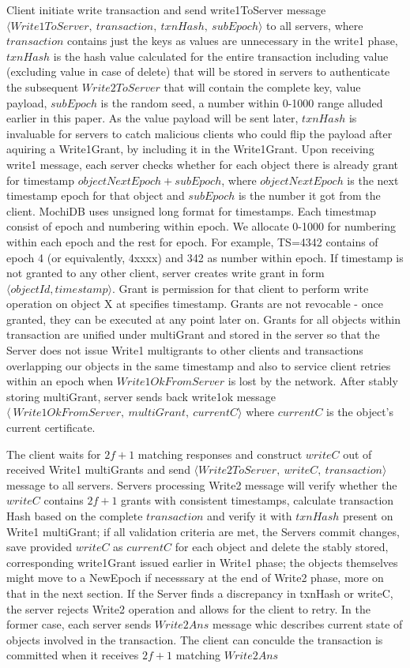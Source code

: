 \documentclass[letterpaper,twocolumn,10pt]{article}
\begin{document}
Client initiate write transaction and send write1ToServer message $\langle Write1ToServer,\ transaction,\ txnHash,\ subEpoch \rangle$ to all servers, where $transaction$ contains just the keys as values are unnecessary in the write1 phase, $txnHash$ is the hash value calculated for the entire transaction including value (excluding value in case of delete) that will be stored in servers to authenticate the subsequent $Write2ToServer$ that will contain the complete key, value payload, $subEpoch$ is the random seed, a number within 0-1000 range alluded earlier in this paper. As the value payload will be sent later, $txnHash$ is invaluable for servers to catch malicious clients who could flip the payload after aquiring a Write1Grant, by including it in the Write1Grant. Upon receiving write1 message, each server checks whether for each object there is already grant for timestamp $objectNextEpoch + subEpoch$, where $objectNextEpoch$ is the next timestamp epoch for that object and $subEpoch$ is the number it got from the client. MochiDB uses unsigned long format for timestamps. Each timestmap consist of epoch and numbering within epoch. We allocate 0-1000 for numbering within each epoch and the rest for epoch. For example, TS=4342 contains of epoch 4 (or equivalently, 4xxxx) and 342 as number within epoch. If timestamp is not granted to any other client, server creates write grant in form $\langle objectId, timestamp \rangle$. Grant is permission for that client to perform write operation on object X at specifies timestamp. Grants are not revocable - once granted, they can be executed at any point later on. Grants for all objects within transaction are unified under multiGrant and stored in the server so that the Server does not issue Write1 multigrants to other clients and transactions overlapping our objects in the same timestamp and also to service client retries within an epoch when $Write1OkFromServer$ is lost by the network. After stably storing multiGrant, server sends back write1ok message $\langle\ Write1OkFromServer,\ multiGrant,\ currentC \rangle$ where $currentC$ is the object's current certificate.

The client waits for $2f+1$ matching responses and construct $writeC$ out of received Write1 multiGrants and send $\langle Write2ToServer,\ writeC,\ transaction \rangle$ message to all servers. Servers processing Write2 message will verify whether the $writeC$ contains $2f+1$ grants with consistent timestamps, calculate transaction Hash based on the complete $transaction$ and verify it with $txnHash$ present on Write1 multiGrant; if all validation criteria are met, the Servers commit changes, save provided $writeC$ as $currentC$ for each object and delete the stably stored, corresponding write1Grant issued earlier in Write1 phase; the objects themselves might move to a NewEpoch if necesssary at the end of Write2 phase, more on that in the next section. If the Server finds a discrepancy in txnHash or writeC, the server rejects Write2 operation and allows for the client to retry. In the former case, each server sends $Write2Ans$ message whic describes current state of objects involved in the transaction. The client can conculde the transaction is committed when it receives $2f+1$ matching $Write2Ans$
\end{document}
